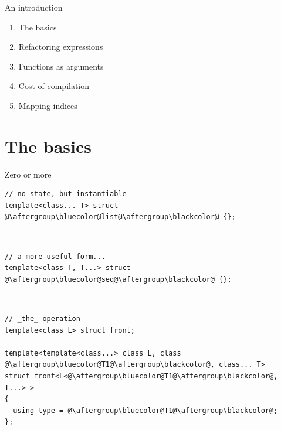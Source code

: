 \documentclass[xcolor=dvipsnames]{beamer}
\begin{document}
\begin{frame}[fragile]{An introduction}
  \begin{enumerate}
  \item The basics \vspace{5mm}
  \item Refactoring expressions \vspace{5mm}
  \item Functions as arguments \vspace{5mm}
  \item Cost of compilation \vspace{5mm}
  \item Mapping indices \vspace{5mm}
  \end{enumerate}
\end{frame}


\section{The basics}


\begin{frame}[fragile]{Zero or more}
\begin{lstlisting}
// no state, but instantiable
template<class... T> struct @\aftergroup\bluecolor@list@\aftergroup\blackcolor@ {};
\end{lstlisting}

~

\begin{lstlisting}
// a more useful form...
template<class T, T...> struct @\aftergroup\bluecolor@seq@\aftergroup\blackcolor@ {};
\end{lstlisting}

~

\begin{lstlisting}
// _the_ operation
template<class L> struct front;

template<template<class...> class L, class @\aftergroup\bluecolor@T1@\aftergroup\blackcolor@, class... T>
struct front<L<@\aftergroup\bluecolor@T1@\aftergroup\blackcolor@, T...> >
{
  using type = @\aftergroup\bluecolor@T1@\aftergroup\blackcolor@;
};
\end{lstlisting}
\end{frame}
\end{document}
